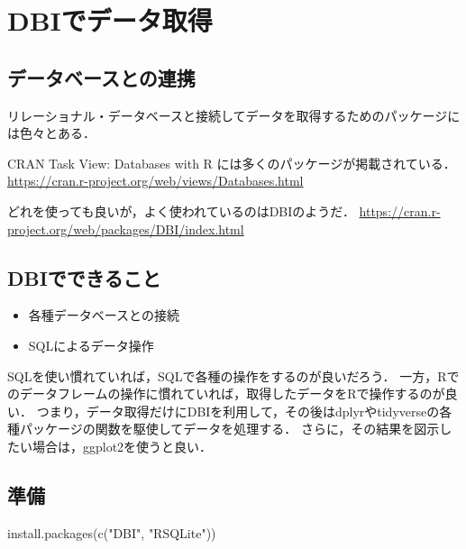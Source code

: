 \documentclass[
]{article}
\newenvironment{Shaded}{\begin{snugshade}}{\end{snugshade}}
\newcommand{\FunctionTok}[1]{\textcolor[rgb]{0.00,0.00,0.00}{#1}}
\newcommand{\NormalTok}[1]{#1}
\newcommand{\StringTok}[1]{\textcolor[rgb]{0.31,0.60,0.02}{#1}}
\providecommand{\tightlist}{%
  \setlength{\itemsep}{0pt}\setlength{\parskip}{0pt}}
\begin{document}
\hypertarget{dbi}{%
\section{DBIでデータ取得}\label{dbi}}

\hypertarget{ux30c7ux30fcux30bfux30d9ux30fcux30b9ux3068ux306eux9023ux643a}{%
\subsection{データベースとの連携}\label{ux30c7ux30fcux30bfux30d9ux30fcux30b9ux3068ux306eux9023ux643a}}

リレーショナル・データベースと接続してデータを取得するためのパッケージには色々とある．

CRAN Task View: Databases with R には多くのパッケージが掲載されている．
\url{https://cran.r-project.org/web/views/Databases.html}

どれを使っても良いが，よく使われているのはDBIのようだ．
\url{https://cran.r-project.org/web/packages/DBI/index.html}

\hypertarget{dbiux3067ux3067ux304dux308bux3053ux3068}{%
\subsection{DBIでできること}\label{dbiux3067ux3067ux304dux308bux3053ux3068}}

\begin{itemize}
\tightlist
\item
  各種データベースとの接続\\
\item
  SQLによるデータ操作
\end{itemize}

SQLを使い慣れていれば，SQLで各種の操作をするのが良いだろう．
一方，Rでのデータフレームの操作に慣れていれば，取得したデータをRで操作するのが良い．
つまり，データ取得だけにDBIを利用して，その後はdplyrやtidyverseの各種パッケージの関数を駆使してデータを処理する．
さらに，その結果を図示したい場合は，ggplot2を使うと良い．

\hypertarget{ux6e96ux5099-12}{%
\subsection{準備}\label{ux6e96ux5099-12}}

\begin{Shaded}
\begin{Highlighting}[]
\FunctionTok{install.packages}\NormalTok{(}\FunctionTok{c}\NormalTok{(}\StringTok{"DBI"}\NormalTok{, }\StringTok{"RSQLite"}\NormalTok{))}
\end{Highlighting}
\end{Shaded}
\end{document}
